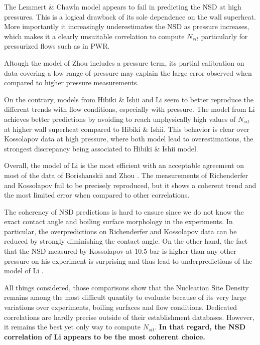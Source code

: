 The Lemmert \& Chawla model appears to fail in predicting the NSD at high pressures. This is a logical drawback of its sole dependence on the wall superheat. More importantly it increasingly underestimates the NSD as pressure increases, which makes it a clearly unsuitable correlation to compute $N_{sit}$ particularly for pressurized flows such as in PWR.

Altough the model of Zhou \etal includes a pressure term, its partial calibration on data covering a low range of pressure may explain the large error observed when compared to higher pressure measurements.

On the contrary, models from Hibiki \& Ishii and Li \etal seem to better reproduce the different trends with flow conditions, especially with pressure. The model from Li \etal achieves better predictions by avoiding to reach unphysically high values of $N_{sit}$ at higher wall superheat compared to Hibiki \& Ishii. This behavior is clear over Kossolapov data at high pressure, where both model lead to overestimations, the strongest discrepancy being associated to Hibiki \& Ishii model.

Overall, the model of Li \etal is the most efficient with an acceptable agreement on most of the data of Borishanskii and Zhou \etal. The measurements of Richenderfer and Kossolapov fail to be precisely reproduced, but it shows a coherent trend and the most limited error when compared to other correlations.

\begin{remark*}{}
The coherency of NSD predictions is hard to ensure since we do not know the exact contact angle and boiling surface morphology in the experiments. In particular, the overpredictions on Richenderfer and Kossolapov data can be reduced by strongly diminishing the contact angle. On the other hand, the fact that the NSD measured by Kossolapov at $10.5$ bar is higher than any other pressure on his experiment is surprising and thus lead to underpredictions of the model of Li \etal.
\end{remark*}


All things considered, those comparisons show that the Nucleation Site Density remains among the most difficult quantity to evaluate because of its very large variations over experiments, boiling surfaces and flow conditions. Dedicated correlations are hardly precise outside of their establishment databases. However, it remains the best yet only way to compute $N_{sit}$. \textbf{In that regard, the NSD correlation of Li \etal appears to be the most coherent choice.}


